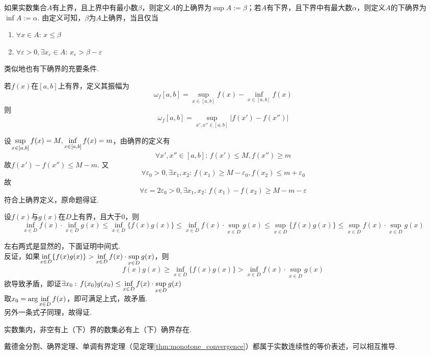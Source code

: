 \begin{definition}[确界]
如果实数集合$A$有上界，且上界中有最小数$\beta$，则定义$A$的上确界为$\sup A:=\beta$；若$A$有下界，且下界中有最大数$\alpha$，则定义$A$的下确界为$\inf A:=\alpha$.
由定义可知，$\beta$为$A$上确界，当且仅当
\begin{enumerate}
	\itemsep -3pt
	\item $\forall x\in A:\,x\leq\beta$
	\item $\forall\varepsilon>0,\exists x_\varepsilon\in A:\,x_\varepsilon >\beta-\varepsilon$
\end{enumerate}
\par 类似地也有下确界的充要条件.
\begin{example}
若$f(x)$在$[a,b]$上有界，定义其振幅为
\[\omega_f[a,b]=\sup_{x\in[a,b]}f(x)-\inf_{x\in[a,b]}f(x)\]
则
\[\omega_f[a,b]=\sup_{x',x''\in[a,b]}|f(x')-f(x'')|\]
\end{example}
\begin{analysis}
设$\displaystyle\sup_{x\in[a,b]}f(x)=M,\inf_{x\in[a,b]}f(x)=m$，由确界的定义有
\[\forall x',x''\in[a,b]:\,f(x')\leq M,f(x'')\geq m\]
故$f(x')-f(x'')\leq M-m$. 又
\[\forall\varepsilon_0>0,\exists x_1,x_2:\,f(x_1)\geq M-\varepsilon_0,f(x_2)\leq m+\varepsilon_0\]
故
\[\forall\varepsilon=2\varepsilon_0>0,\exists x_1,x_2:\,f(x_1)-f(x_2)\geq M-m-\varepsilon\]
符合上确界定义，原命题得证.
\end{analysis}
\begin{example}
\label{ex:inf_sup_inequality}
设$f(x)$与$g(x)$在$D$上有界，且大于$0$，则
\[\inf_{x\in D}f(x)\cdot\inf_{x\in D}g(x)\leq\inf_{x\in D}\{f(x)g(x)\}\leq\inf_{x\in D}f(x)\cdot\sup_{x\in D}g(x)\leq\sup_{x\in D}\{f(x)g(x)\}\leq\sup_{x\in D}f(x)\cdot\sup_{x\in D}g(x)\]
\end{example}
\begin{analysis}
左右两式是显然的，下面证明中间式.\\
反证，如果$\displaystyle\inf_{x\in D}\{f(x)g(x)\}>\inf_{x\in D}f(x)\cdot\sup_{x\in D}g(x)$，则
\[f(x)g(x)\geq\inf_{x\in D}\{f(x)g(x)\}>\inf_{x\in D}f(x)\cdot\sup_{x\in D}g(x)\]
欲导致矛盾，即证$\displaystyle\exists x_0:\,f(x_0)g(x_0)\leq \inf_{x\in D}f(x)\cdot\sup_{x\in D}g(x)$\\
取$\displaystyle x_0=\arg\inf_{x\in D}f(x)$，即可满足上式，故矛盾.\\
另外一条式子同理，故得证.
\end{analysis}
\end{definition}
\begin{theorem}[确界定理]
实数集内，非空有上（下）界的数集必有上（下）确界存在.
\end{theorem}
\par 戴德金分割、确界定理、单调有界定理（见定理\ref{thm:monotone_convergence}）都属于实数连续性的等价表述，可以相互推导.

